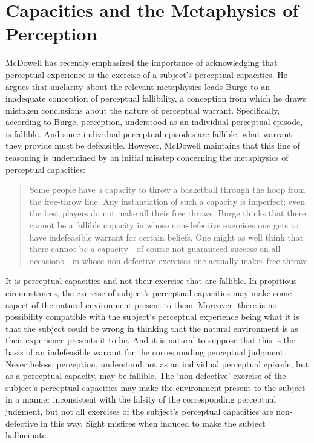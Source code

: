 \documentclass[12pt]{article}
\begin{document}

\section{Capacities and the Metaphysics of Perception} %
\label{sec:capacities_and_the_metaphysics_of_perception}

McDowell has recently emphasized the importance of acknowledging that perceptual experience is the exercise of a subject's perceptual capacities. He argues that unclarity about the relevant metaphysics leads Burge to an inadequate conception of perceptual fallibility, a conception from which he draws mistaken conclusions about the nature of perceptual warrant. Specifically, according to Burge, perception, understood as an individual perceptual episode, is fallible. And since individual perceptual episodes are fallible, what warrant they provide must be defeasible. However, McDowell maintains that this line of reasoning is undermined by an initial misstep concerning the metaphysics of perceptual capacities:
\begin{quote}
	Some people have a capacity to throw a basketball through the hoop from the free-throw line. Any instantiation of such a capacity is imperfect; even the best players do not make all their free throws. Burge thinks that there cannot be a fallible capacity in whose non-defective exercises one gets to have indefeasible warrant for certain beliefs. One might as well think that there cannot be a capacity---of course not guaranteed success on all occasions---in whose non-defective exercises one actually makes free throws.
\end{quote}
It is perceptual capacities and not their exercise that are fallible. In propitious circumstances, the exercise of subject's perceptual capacities may make some aspect of the natural environment present to them. Moreover, there is no possibility compatible with the subject's perceptual experience being what it is that the subject could be wrong in thinking that the natural environment is as their experience presents it to be. And it is natural to suppose that this is the basis of an indefeasible warrant for the corresponding perceptual judgment. Nevertheless, perception, understood not as an individual perceptual episode, but as a perceptual capacity, may be fallible. The `non-defective' exercise of the subject's perceptual capacities may make the environment present to the subject in a manner inconsistent with the falsity of the corresponding perceptual judgment, but not all exercises of the subject's perceptual capacities are non-defective in this way. Sight misfires when induced to make the subject hallucinate. 
\end{document}
